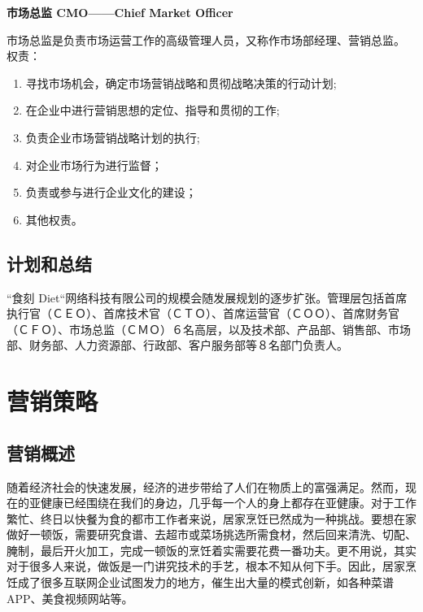 \documentclass[UTF8,12pt]{ctexart}
\numberwithin{figure}{section}%
\begin{document}
\begin{spacing}{2}
\textbf{市场总监 CMO——Chief Market Officer}

市场总监是负责市场运营工作的高级管理人员，又称作市场部经理、营销总监。
权责：

\begin{enumerate}
	\item 寻找市场机会，确定市场营销战略和贯彻战略决策的行动计划;
	
	\item 在企业中进行营销思想的定位、指导和贯彻的工作;
	
	\item 负责企业市场营销战略计划的执行;
	
	\item 对企业市场行为进行监督；
	
	\item 负责或参与进行企业文化的建设；
	
	\item 其他权责。
	
\end{enumerate}

\subsection{计划和总结}
“食刻 Diet“网络科技有限公司的规模会随发展规划的逐步扩张。管理层包括首席执行官（ＣＥＯ）、首席技术官（ＣＴＯ）、首席运营官（ＣＯＯ）、首席财务官（ＣＦＯ）、市场总监（ＣＭＯ）６名高层，以及技术部、产品部、销售部、市场部、财务部、人力资源部、行政部、客户服务部等８名部门负责人。




\newpage	
\section{营销策略}

\subsection{营销概述}

随着经济社会的快速发展，经济的进步带给了人们在物质上的富强满足。然而，现在的亚健康已经围绕在我们的身边，几乎每一个人的身上都存在亚健康。对于工作繁忙、终日以快餐为食的都市工作者来说，居家烹饪已然成为一种挑战。要想在家做好一顿饭，需要研究食谱、去超市或菜场挑选所需食材，然后回来清洗、切配、腌制，最后开火加工，完成一顿饭的烹饪着实需要花费一番功夫。更不用说，其实对于很多人来说，做饭是一门讲究技术的手艺，根本不知从何下手。因此，居家烹饪成了很多互联网企业试图发力的地方，催生出大量的模式创新，如各种菜谱APP、美食视频网站等。


\end{spacing}
\end{document}
